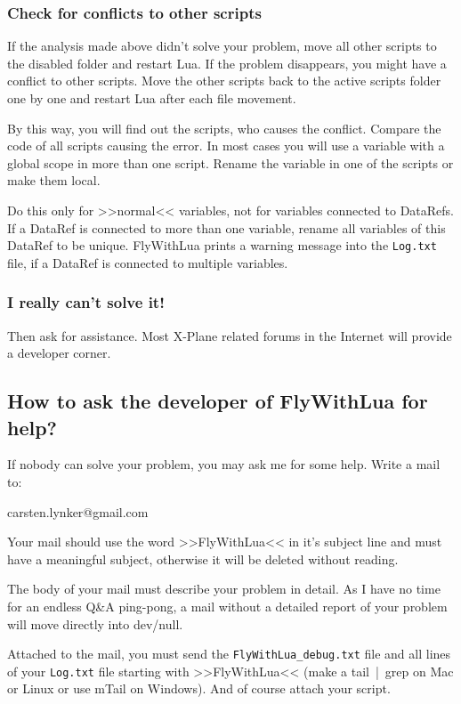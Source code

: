 \documentclass[11pt,parskip=half,a4paper]{scrartcl}
\begin{document}
\subsubsection{Check for conflicts to other scripts}

If the analysis made above didn't solve your problem, move all other scripts to the disabled folder and restart Lua. If the problem disappears, you might have a conflict to other scripts. Move the other scripts back to the active scripts folder one by one and restart Lua after each file movement. 

By this way, you will find out the scripts, who causes the conflict. Compare the code of all scripts causing the error. In most cases you will use a variable with a global scope in more than one script. Rename the variable in one of the scripts or make them local.

Do this only for >>normal<< variables, not for variables connected to DataRefs. If a DataRef is connected to more than one variable, rename all variables of this DataRef to be unique. FlyWithLua prints a warning message into the \verb|Log.txt| file, if a DataRef is connected to multiple variables.

\subsubsection{I really can't solve it!}

Then ask for assistance. Most X-Plane related forums in the Internet will provide a developer corner.

\subsection{How to ask the developer of FlyWithLua for help?}

If nobody can solve your problem, you may ask me for some help. Write a mail to:

carsten.lynker@gmail.com

Your mail should use the word >>FlyWithLua<< in it's subject line and must have a meaningful subject, otherwise it will be deleted without reading.

The body of your mail must describe your problem in detail. As I have no time for an endless Q\&A ping-pong, a mail without a detailed report of your problem will move directly into dev/null.

Attached to the mail, you must send the \verb|FlyWithLua_debug.txt| file and all lines of your \verb|Log.txt| file starting with >>FlyWithLua<< (make a tail~|~grep on Mac or Linux or use mTail on Windows). And of course attach your script.
\end{document}
